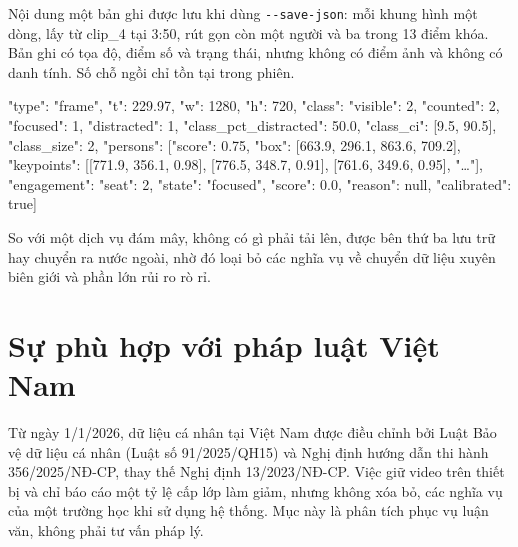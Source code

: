 Nội dung một bản ghi được lưu khi dùng \texttt{-\/-save-json}: mỗi khung hình một dòng, lấy từ clip\_4 tại 3:50, rút gọn còn một người và ba trong 13 điểm khóa. Bản ghi có tọa độ, điểm số và trạng thái, nhưng không có điểm ảnh và không có danh tính. Số chỗ ngồi chỉ tồn tại trong phiên.

\begin{codeblock}
{"type": "frame", "t": 229.97, "w": 1280, "h": 720,
 "class": {"visible": 2, "counted": 2, "focused": 1, "distracted": 1,
           "class_pct_distracted": 50.0, "class_ci": [9.5, 90.5], "class_size": 2},
 "persons": [{"score": 0.75, "box": [663.9, 296.1, 863.6, 709.2],
              "keypoints": [[771.9, 356.1, 0.98], [776.5, 348.7, 0.91], [761.6, 349.6, 0.95], "…"],
              "engagement": {"seat": 2, "state": "focused", "score": 0.0, "reason": null, "calibrated": true}}]}
\end{codeblock}

So với một dịch vụ đám mây, không có gì phải tải lên, được bên thứ ba lưu trữ hay chuyển ra nước ngoài, nhờ đó loại bỏ các nghĩa vụ về chuyển dữ liệu xuyên biên giới và phần lớn rủi ro rò rỉ.

\section{Sự phù hợp với pháp luật Việt Nam}

Từ ngày 1/1/2026, dữ liệu cá nhân tại Việt Nam được điều chỉnh bởi Luật Bảo vệ dữ liệu cá nhân (Luật số 91/2025/QH15) \cite{b12} và Nghị định hướng dẫn thi hành 356/2025/NĐ-CP, thay thế Nghị định 13/2023/NĐ-CP. Việc giữ video trên thiết bị và chỉ báo cáo một tỷ lệ cấp lớp làm giảm, nhưng không xóa bỏ, các nghĩa vụ của một trường học khi sử dụng hệ thống. Mục này là phân tích phục vụ luận văn, không phải tư vấn pháp lý.

